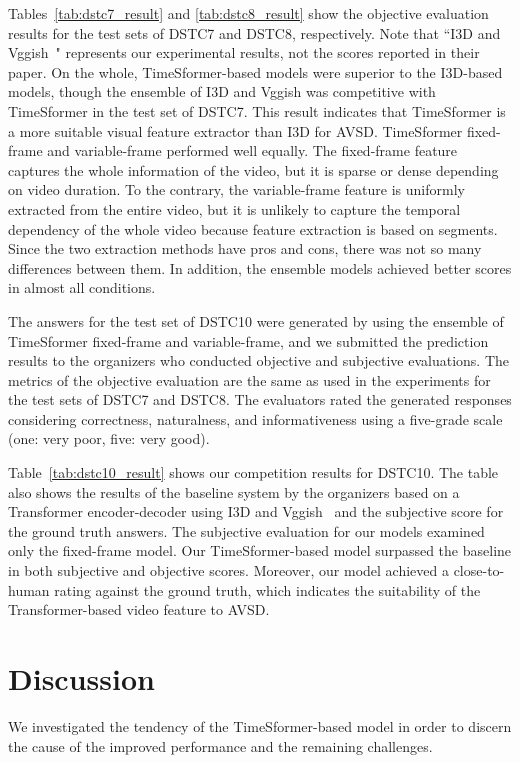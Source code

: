 \documentclass[letterpaper]{article}
\begin{document}
Tables~\ref{tab:dstc7_result} and \ref{tab:dstc8_result} show the objective evaluation results for the test sets of DSTC7 and DSTC8, respectively.
Note that ``I3D and Vggish~\cite{Li2021bridging}" represents our experimental results, not the scores reported in their paper.
On the whole, TimeSformer-based models were superior to the I3D-based models, though the ensemble of I3D and Vggish was competitive with TimeSformer in the test set of DSTC7.
This result indicates that TimeSformer is a more suitable visual feature extractor than I3D for AVSD.
TimeSformer fixed-frame and variable-frame performed well equally.
The fixed-frame feature captures the whole information of the video, but it is sparse or dense depending on video duration.
To the contrary, the variable-frame feature is uniformly extracted from the entire video, but it is unlikely to capture the temporal dependency of the whole video because feature extraction is based on segments.
Since the two extraction methods have pros and cons, there was not so many differences between them.
In addition, the ensemble models achieved better scores in almost all conditions.

The answers for the test set of DSTC10 were generated by using the ensemble of TimeSformer fixed-frame and variable-frame, and we submitted the prediction results to the organizers
who conducted objective and subjective evaluations.
The metrics of the objective evaluation are the same as used in the experiments for the test sets of DSTC7 and DSTC8.
The evaluators rated the generated responses considering correctness, naturalness, and informativeness using a five-grade scale (one: very poor, five: very good).

Table~\ref{tab:dstc10_result} shows our competition results for DSTC10.
The table also shows the results of the baseline system by the organizers based on a Transformer encoder-decoder using I3D and Vggish~\cite{Shah2021audio} and the subjective score for the ground truth answers.
The subjective evaluation for our models examined only the fixed-frame model.
Our TimeSformer-based model surpassed the baseline in both subjective and objective scores.
Moreover, our model achieved a close-to-human rating against the ground truth, which indicates the suitability of the Transformer-based video feature to AVSD.


\section{Discussion}
We investigated the tendency of the TimeSformer-based model in order to discern the cause of the improved performance and the remaining challenges.
\end{document}

